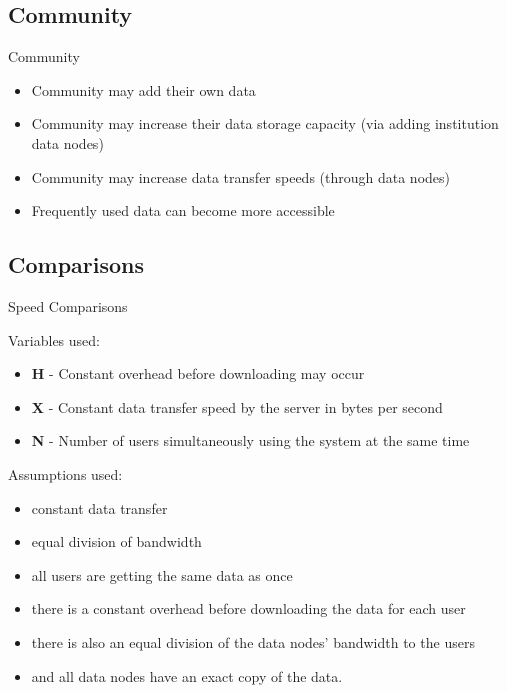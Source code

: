 \documentclass{beamer}
\begin{document}
\subsection{Community}
\begin{frame}{Community}
  \begin{itemize}   
    \item Community may add their own data
    \item Community may increase their data storage capacity (via adding institution data nodes)
    \item Community may increase data transfer speeds (through data nodes)
    \item Frequently used data can become more accessible
  \end{itemize}
\end{frame}

\subsection{Comparisons}
\begin{frame}{Speed Comparisons}

Variables used:
  \begin{itemize}   
    \item \textbf{H} - Constant overhead before downloading may occur
    \item \textbf{X} - Constant data transfer speed by the server in bytes per second
    \item \textbf{N} - Number of users simultaneously using the system at the same time
  \end{itemize}
  
Assumptions used:
\begin{itemize}
    \item constant data transfer
    \item equal division of bandwidth
    \item all users are getting the same data as once
    \item there is a constant overhead before downloading the data for each user
    \item there is also an equal division of the data nodes' bandwidth to the users
    \item and all data nodes have an exact copy of the data.
\end{itemize}
    
\end{frame}
\end{document}
